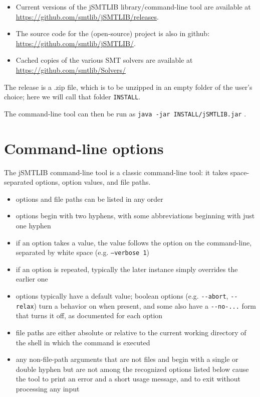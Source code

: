 \documentclass[12pt,oneside]{report}
\begin{document}
\begin{itemize}
\item Current versions of the jSMTLIB library/command-line tool are available at \url{https://github.com/smtlib/jSMTLIB/releases}.
\item The source code for the (open-source) project is also in github: \url{https://github.com/smtlib/jSMTLIB/}.
\item Cached copies of the various SMT solvers are available at \url{https://github.com/smtlib/Solvers/}
\end{itemize}

The release is a .zip file, which is to be unzipped in an empty folder of the user's choice; here we will call that folder \texttt{INSTALL}.

The command-line tool can then be run as \texttt{java -jar INSTALL/jSMTLIB.jar} .

\chapter{Command-line options}

The jSMTLIB command-line tool is a classic command-line tool: it takes space-separated options, option values, and file paths.
\begin{itemize}
\item options and file paths can be listed in any order
\item options begin with two hyphens, with some abbreviations beginning with just one hyphen
\item if an option takes a value, the value follows the option on the command-line, separated by white space (e.g. \texttt{--verbose 1})
\item if an option is repeated, typically the later instance simply overrides the earlier one
\item options typically have a default value; boolean options (e.g. {\tt -{}-abort}, {\tt -{}-relax}) turn a behavior on when present, and some also have a {\tt -{}-no-...} form that turns it off, as documented for each option
\item file paths are either absolute or relative to the current working directory of the shell in which the command is executed
\item any non-file-path arguments that are not files and begin with a single or double hyphen but are not among the recognized options listed below cause the tool to print an error and a short usage message, and to exit without processing any input
\end{itemize}
\end{document}
